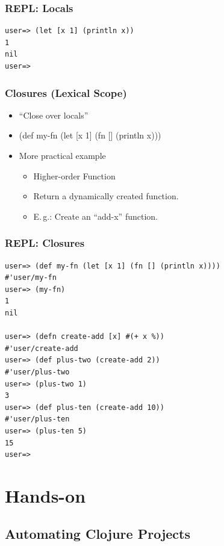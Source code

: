 \documentclass{beamer}
\begin{document}
\begin{frame}[fragile]
\frametitle{REPL: Locals}
\begin{lstlisting}[basicstyle=\scriptsize]
user=> (let [x 1] (println x))
1
nil
user=>  
\end{lstlisting}
\end{frame}

  \begin{frame}
      \frametitle{Closures (Lexical Scope)}

      \begin{itemize}
          \item ``Close over locals''
          \item (def my-fn (let [x 1] (fn [] (println x)))
          \item More practical example
              \begin{itemize}
                  \item Higher-order Function
                  \item Return a dynamically created function.
                  \item E.\,g.: Create an ``add-x'' function.
              \end{itemize}
      \end{itemize}
  \end{frame}

\begin{frame}[fragile]
\frametitle{REPL: Closures}
\begin{lstlisting}[basicstyle=\scriptsize]
user=> (def my-fn (let [x 1] (fn [] (println x))))
#'user/my-fn
user=> (my-fn)
1
nil

user=> (defn create-add [x] #(+ x %))
#'user/create-add
user=> (def plus-two (create-add 2))
#'user/plus-two
user=> (plus-two 1)
3
user=> (def plus-ten (create-add 10))
#'user/plus-ten
user=> (plus-ten 5)
15
user=>  
\end{lstlisting}
\end{frame}

\section{Hands-on}
\subsection{Automating Clojure Projects}
\end{document}
